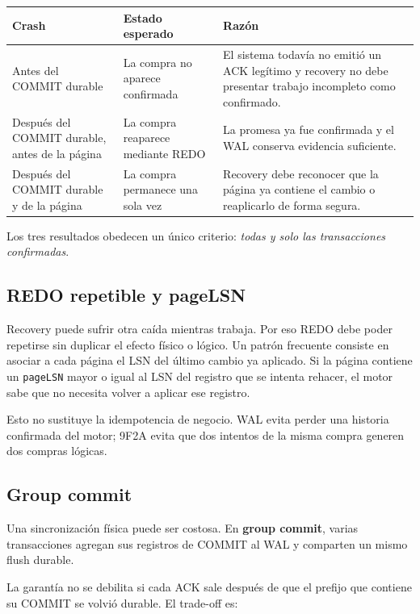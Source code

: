 \documentclass[variant=apuntes,cover=institutional,mode=screen]{ua-engineering-v6-article}
\begin{document}
\begin{center}
\begin{tabular}{p{}p{}p{}}
\toprule
Crash & Estado esperado & Razón \\
\midrule
Antes del COMMIT durable & La compra no aparece confirmada & El sistema todavía no emitió un ACK legítimo y recovery no debe presentar trabajo incompleto como confirmado. \\
Después del COMMIT durable, antes de la página & La compra reaparece mediante REDO & La promesa ya fue confirmada y el WAL conserva evidencia suficiente. \\
Después del COMMIT durable y de la página & La compra permanece una sola vez & Recovery debe reconocer que la página ya contiene el cambio o reaplicarlo de forma segura. \\
\bottomrule
\end{tabular}
\end{center}

Los tres resultados obedecen un único criterio: \emph{todas y solo las transacciones confirmadas}.

\subsection{REDO repetible y pageLSN}

Recovery puede sufrir otra caída mientras trabaja. Por eso REDO debe poder repetirse sin duplicar el efecto físico o lógico. Un patrón frecuente consiste en asociar a cada página el LSN del último cambio ya aplicado. Si la página contiene un \texttt{pageLSN} mayor o igual al LSN del registro que se intenta rehacer, el motor sabe que no necesita volver a aplicar ese registro.

Esto no sustituye la idempotencia de negocio. WAL evita perder una historia confirmada del motor; 9F2A evita que dos intentos de la misma compra generen dos compras lógicas.

\subsection{Group commit}

Una sincronización física puede ser costosa. En \textbf{group commit}, varias transacciones agregan sus registros de COMMIT al WAL y comparten un mismo flush durable.

La garantía no se debilita si cada ACK sale después de que el prefijo que contiene su COMMIT se volvió durable. El trade-off es:
\end{document}
